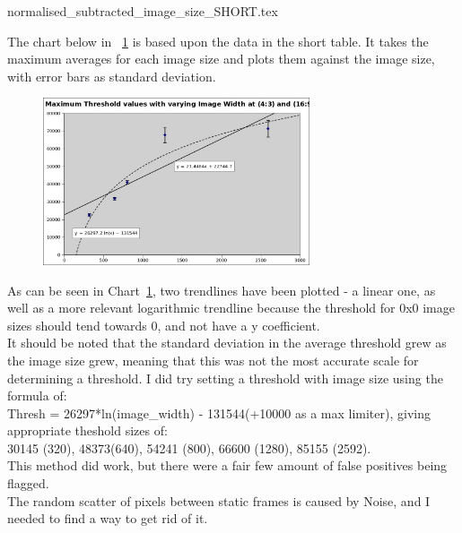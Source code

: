 \documentclass[11pt]{article} %
\begin{document}
{normalised_subtracted_image_size_SHORT.tex}

The chart below in ~\cref{chart:thresholds} is based upon the data in the short table. It takes the maximum averages for each image size and plots them against the image size, with error bars as standard deviation.\\

\begin{figure}
	\vspace{-10pt}
	\begin{center}
		\includegraphics[width=0.7\textwidth]{../images/chart-threshold-with-varying-image}
	\end{center}
	\vspace{-15pt}
	\caption{}
	\label{chart:thresholds}
	\vspace{-10pt}
\end{figure}

As can be seen in Chart~\cref{chart:thresholds}, two trendlines have been plotted - a linear one, as well as a more relevant logarithmic trendline because the threshold for 0x0 image sizes should tend towards 0, and not have a y coefficient.\\
It should be noted that the standard deviation in the average threshold grew as the image size grew, meaning that this was not the most accurate scale for determining a threshold. I did try setting a threshold with image size using the formula of:\\
 Thresh = 26297*ln(image\_width) - 131544(+10000 as a max limiter),  giving appropriate theshold sizes of:\\
30145 (320), 48373(640), 54241 (800), 66600 (1280), 85155 (2592).\\
This method did work, but there were a fair few amount of false positives being flagged.
\\The random scatter of pixels between static frames is caused by Noise, and I needed to find a way to get rid of it.
\end{document}
